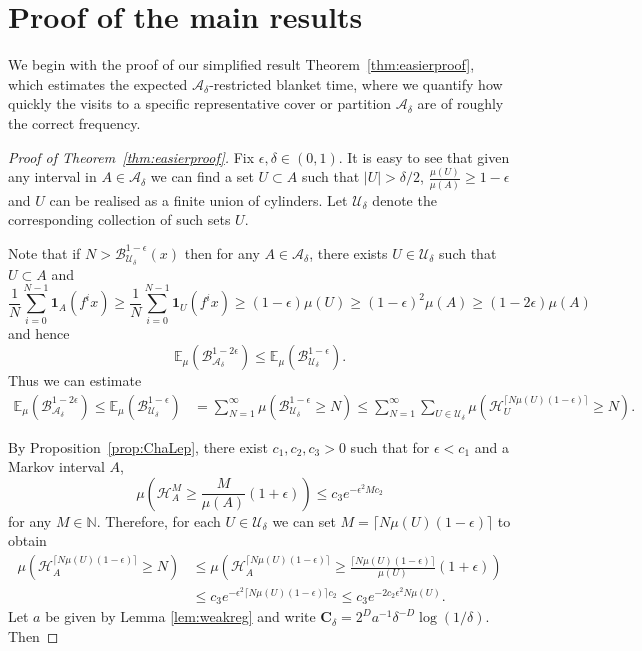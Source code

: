 \documentclass[11pt, reqno]{amsart}
\numberwithin{equation}{section}
\theoremstyle{plain}%
\theoremstyle{definition}
\def\N{\ensuremath{\mathbb N}}
\def\U{\ensuremath{\mathcal U}}
\def\B{\ensuremath{\mathcal B}}
\def\A{\ensuremath{\mathscr A}}
\renewcommand{\H}{\mathcal{H}}
\renewcommand{\A}{\mathcal{A}}
\renewcommand{\U}{\mathcal{U}}
\theoremstyle{nonumberplain}
\begin{document}
\section{Proof of the main results}\label{section:mainproof}

We begin with the proof of our simplified result Theorem~\ref{thm:easierproof}, which estimates the expected $\mathcal{A}_\delta$-restricted blanket time, where we quantify how quickly the visits to a specific representative cover or partition $\mathcal{A}_\delta$ are of roughly the correct frequency.


\begin{proof}[Proof of Theorem~\ref{thm:easierproof}]
Fix $\epsilon, \delta \in (0,1)$. It is easy to see that given any interval in $A \in\A_\delta$ we can find a set $U\subset A$ such that $|U|>\delta/2$, $\frac{\mu(U)}{\mu(A)} \geq 1-{\epsilon}$ and $U$ can be realised as a finite union of cylinders. Let $\U_\delta$ denote the corresponding collection of such sets $U$.  

Note that if $N>\mathcal{B}_{\U_\delta}^{1-\epsilon}(x)$ then for any $A \in \A_\delta$, there exists $U \in \U_\delta$ such that $U \subset A$ and
$$\frac{1}{N} \sum_{i=0}^{N-1} \mathbf{1}_A(f^ix) \geq \frac{1}{N} \sum_{i=0}^{N-1} \mathbf{1}_U(f^ix) \geq \left(1-{\epsilon}\right)\mu(U) \geq \left(1-{\epsilon}\right)^2\mu(A)\geq \left(1-2{\epsilon}\right)\mu(A)$$
and hence 
$$\mathbb{E}_\mu\left(\B_{\A_\delta}^{1-2{\epsilon}}\right) \leq \mathbb{E}_\mu\left(\B_{\U_\delta}^{1-\epsilon}\right).$$
Thus we can estimate
\begin{align*}
\mathbb{E}_\mu(\B_{\A_\delta}^{1-2{\epsilon}}) \leq \mathbb{E}_\mu(\B_{\U_\delta}^{1-\epsilon})   &= \sum_{N=1}^\infty \mu\left(\B_{\U_\delta}^{1-\epsilon} \geq N\right)\leq \sum_{N=1}^\infty \sum_{U \in \U_\delta} \mu\left(\H_U^{\lceil N \mu(U)(1-\epsilon)\rceil} \geq N\right).
\end{align*}

 By Proposition~\ref{prop:ChaLep}, there exist $c_1,c_2,c_3>0$ such that for $\epsilon<c_1$ and a Markov interval $A$,
$$
\mu\left( \H_A^{M } \geq \frac{M}{\mu(A)} (1+\epsilon)\right) \le c_3 e^{-\epsilon^2Mc_2}
$$
for any $M \in \N$. Therefore, for each $U \in \U_\delta$ we can set $M=\lceil N \mu(U)(1-\epsilon)\rceil$ to obtain
\begin{align*}
\mu\left( \H_A^{\lceil N \mu(U)(1-\epsilon)\rceil} \geq N\right) &\leq \mu\left( \H_A^{\lceil N \mu(U)(1-\epsilon)\rceil} \geq \frac{\lceil N \mu(U)(1-\epsilon)\rceil}{\mu(U)}(1+\epsilon)\right)  \nonumber\\
&    \le c_3 e^{-\epsilon^2\lceil N \mu(U)(1-\epsilon)\rceil c_2} \leq c_3e^{-2c_2\epsilon^2N \mu(U)}. 
\end{align*}
Let $a$ be given by Lemma \ref{lem:weakreg} and write  $\mathbf{C}_\delta=2^{D}a^{-1} \delta^{-D} \log (1/\delta)$. Then


\end{proof}
\end{document}
